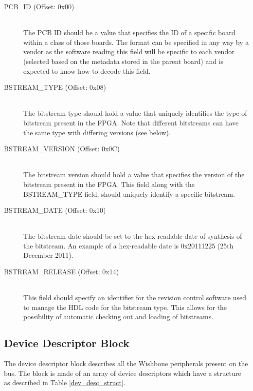 \documentclass{article}
\begin{document}
\begin{description}
\item[PCB\_ID (Offset: 0x00)] \hfill \\
The PCB ID should be a value that specifies the ID of a specific board within
a class of those boards. The format can be specified in any way by a vendor
as the software reading this field will be specific to each vendor (selected
based on the metadata stored in the parent board) and is expected to know how to decode
this field.

\item[BSTREAM\_TYPE (Offset: 0x08)] \hfill \\
The bitstream type should hold a value that uniquely identifies the type of 
bitstream present in the FPGA. Note that different bitstreams can have the
same type with differing versions (see below).

\item[BSTREAM\_VERSION (Offset: 0x0C)] \hfill \\
The bitstream version should hold a value that specifies the version of the
bitstream present in the FPGA. This field along with the BSTREAM\_TYPE field,
should uniquely identify a specific bitstream.

\item[BSTREAM\_DATE (Offset: 0x10)] \hfill \\
The bitstream date should be set to the hex-readable date of synthesis of
the bitstream. An example of a hex-readable date is 0x20111225 (25th December
2011).

\item[BSTREAM\_RELEASE (Offset: 0x14)] \hfill \\
This field should specify an identifier for the revision control software
used to manage the HDL code for the bitstream type. This allows for the 
possibility of automatic checking out and loading of bitstreams.
\end{description}

\subsection{Device Descriptor Block}\label{device_block}

The device descriptor block describes all the Wishbone peripherals present
on the bus. The block is made of an array of device descriptors which have
a structure as described in Table \ref{dev_desc_struct}.
\end{document}
